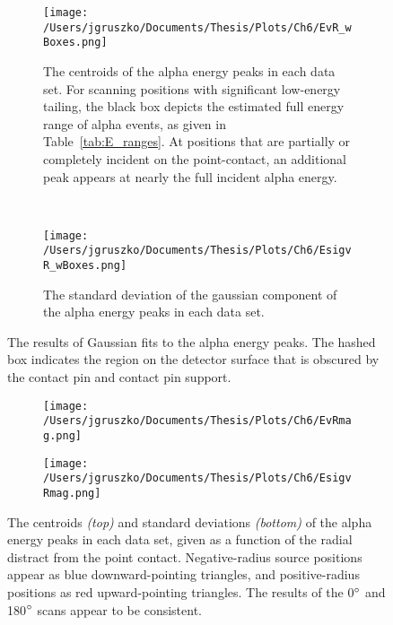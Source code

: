 \begin{figure*}[]
 \centering
  \begin{subfigure}[]{\textwidth}
  \centering
 \texttt{[image: /Users/jgruszko/Documents/Thesis/Plots/Ch6/EvR\_wBoxes.png]}
 \caption[The centroids of the alpha energy peaks in each data set]{The centroids of the alpha energy peaks in each data set. For scanning positions with significant low-energy tailing, the black box depicts the estimated full energy range of alpha events, as given in Table~\ref{tab:E_ranges}. At positions that are partially or completely incident on the point-contact, an additional peak appears at nearly the full incident alpha energy. } 
 \label{fig:Efit_mu}
\end{subfigure}
~
\begin{subfigure}[]{\textwidth}
\centering
 \texttt{[image: /Users/jgruszko/Documents/Thesis/Plots/Ch6/EsigvR\_wBoxes.png]}
 \caption{The standard deviation of the gaussian component of the alpha energy peaks in each data set.} 
 \label{fig:Efit_sig}
 \end{subfigure}
 \caption[The results of Gaussian fits to the alpha energy peaks]{The results of Gaussian fits to the alpha energy peaks. The hashed box indicates the region on the detector surface that is obscured by the contact pin and contact pin support.}
\end{figure*}

\begin{figure*}[]
 \centering
 \begin{subfigure}[]{\textwidth}
 \centering
 \texttt{[image: /Users/jgruszko/Documents/Thesis/Plots/Ch6/EvRmag.png]}
\end{subfigure}
 \begin{subfigure}[]{\textwidth}
 \centering
 \texttt{[image: /Users/jgruszko/Documents/Thesis/Plots/Ch6/EsigvRmag.png]}
\end{subfigure}
 \caption[Energy fit results as a function of distance from the point contact]{The centroids {\it (top)} and standard deviations {\it (bottom)} of the alpha energy peaks in each data set, given as a function of the radial distract from the point contact. Negative-radius source positions appear as blue downward-pointing triangles, and positive-radius positions as red upward-pointing triangles. The results of the 0$\degree$ and 180$\degree$ scans appear to be consistent.} 
 \label{fig:Efit_rMag}
\end{figure*}

